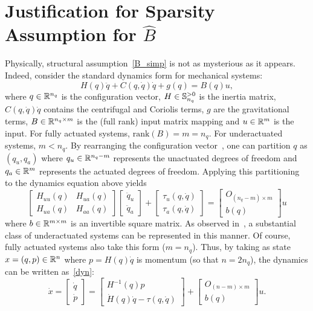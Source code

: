 \section{Justification for Sparsity Assumption for $\hat{B}$}
\label{app:justify_B}

Physically, structural assumption~\eqref{B_simp} is not as mysterious as it appears. Indeed, consider the standard dynamics form for mechanical systems:
\[
	H(q) \ddot{q} + C(q,\dot{q}) \dot{q} + g(q) = B(q) u,
\]
where $q \in \mathbb{R}^{n_q}$ is the configuration vector, $H \in \mathbb{S}^{>0}_{n_q}$ is the inertia matrix, $C(q,\dot{q})\dot{q}$ contains the centrifugal and Coriolis terms, $g$ are the gravitational terms, $B \in \mathbb{R}^{n_q \times m}$ is the (full rank) input matrix mapping and $u \in \mathbb{R}^{m}$ is the input. For fully actuated systems, $\mathrm{rank}(B) = m = n_q$. For underactuated systems, $m < n_q$. By rearranging the configuration vector~\cite{Spong1998,Olfati-Saber2001,ReyhanogluSchaftEtAl1999}, one can partition $q$ as $(q_u, q_a)$ where $q_u \in \mathbb{R}^{n_q - m}$ represents the unactuated degrees of freedom and $q_a \in \mathbb{R}^{m}$ represents the actuated degrees of freedom. Applying this partitioning to the dynamics equation above yields
\[
	\begin{bmatrix} H_{uu} (q) & H_{ua}(q) \\ H_{ua}(q) & H_{aa} (q)\end{bmatrix} \begin{bmatrix} \ddot{q}_u \\ \ddot{q}_a \end{bmatrix} + \begin{bmatrix} \tau_u(q,\dot{q}) \\ \tau_a (q,\dot{q}) \end{bmatrix} = \begin{bmatrix} O_{(n_q-m)\times m} \\ b(q) \end{bmatrix} u
\]
where $b \in \mathbb{R}^{m \times m}$ is an invertible square matrix. As observed in~\cite{ReyhanogluSchaftEtAl1999}, a substantial class of underactuated systems can be represented in this manner. Of course, fully actuated systems also take this form ($m = n_q$). Thus, by taking as state $x = (q, p) \in \mathbb{R}^{n}$ where $p = H(q) \dot{q}$ is momentum (so that $n = 2n_q$), the dynamics can be written as~\eqref{dyn}:
\begin{equation}
	\dot{x} = \begin{bmatrix} \dot{q} \\ \dot{p} \end{bmatrix} = \begin{bmatrix} H^{-1} (q) p \\ \dot{H}(q) \dot{q} - \tau(q,\dot{q}) \end{bmatrix}  + \begin{bmatrix} O_{(n-m) \times m} \\ b(q) \end{bmatrix}u.
\label{under_a}
\end{equation}
